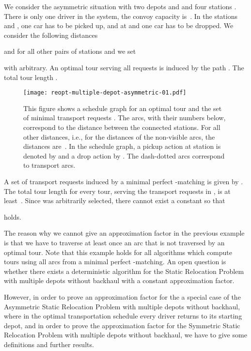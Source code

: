 \documentclass[english]{llncs}
\numberwithin{sublemma}{lemma}
\begin{document}
\begin{example}\label{ex: static: reopt: multiple: asymmetric non possible}
We consider the asymmetric situation with two depots  and  and four stations .
There is only one driver in the system, the convoy capacity is~.
In the stations  and , one car has to be picked up, and at  and  one car has to be dropped.
We consider the following distances

and for all other pairs of stations  and  we set

with  arbitrary.
An optimal tour  serving all requests is induced by the path .
The total tour length .

\begin{figure}[ht]
    \centering
    \texttt{[image: reopt-multiple-depot-asymmetric-01.pdf]}
 \caption{
  This figure shows a schedule graph for an optimal tour  and the set of minimal transport requests .
  The arcs, with their numbers below, correspond to the distance between the connected stations.
  For all other distances, i.e., for the distances of the non-visible arcs, the distances are~.
  In the schedule graph, a pickup action at station  is denoted by  and a drop action by .
  The dash-dotted arcs correspond to transport arcs.
 }
 \label{fig: static: reopt: multiple: asymmetric 01}
\end{figure}


A set of transport requests induced by a minimal perfect -matching is given by .
The total tour length  for every tour, serving the transport requests in , is at least~.
Since  was arbitrarily selected, there cannot exist a constant  so that

holds.
\end{example}



The reason why we cannot give an approximation factor in the previous example is that we have to traverse at least once an arc that is not traversed by an optimal tour.
Note that this example holds for all algorithms which compute tours using all arcs from a minimal perfect -matching.
An open question is whether there exists a deterministic algorithm for the Static Relocation Problem with multiple depots without backhaul with a constant approximation factor.


However, in order to prove an approximation factor for the a special case of the Asymmetric Static Relocation Problem with multiple depots without backhaul,
where in the optimal transportation schedule every driver returns to its starting depot,
and in order to prove the approximation factor for the Symmetric Static Relocation Problem with multiple depots without backhaul,
we have to give some definitions and further results.
\end{document}
